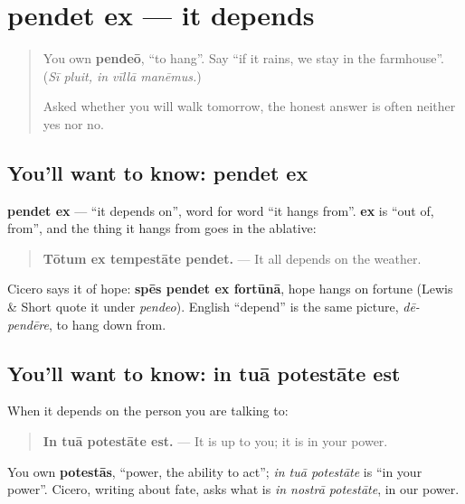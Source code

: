 \section[pendet ex]{pendet ex — it depends}

\label{lesson:LA-C289-pendet-ex}



\begin{quote}
You own \textbf{pendeō}, \textquotedblleft{}to hang\textquotedblright{}. Say \textquotedblleft{}if it rains, we stay in the farmhouse\textquotedblright{}. (\emph{Sī pluit, in vīllā manēmus.})

Asked whether you will walk tomorrow, the honest answer is often neither yes nor no.
\end{quote}

\subsection*{You'll want to know: pendet ex}
\textbf{pendet ex} — \textquotedblleft{}it depends on\textquotedblright{}, word for word \textquotedblleft{}it hangs from\textquotedblright{}. \textbf{ex} is \textquotedblleft{}out of, from\textquotedblright{}, and the thing it hangs from goes in the ablative:

\begin{quote}
\textbf{Tōtum ex tempestāte pendet.} — It all depends on the weather.
\end{quote}

Cicero says it of hope: \textbf{spēs pendet ex fortūnā}, hope hangs on fortune (Lewis \& Short quote it under \emph{pendeo}). English \textquotedblleft{}depend\textquotedblright{} is the same picture, \emph{dē-pendēre}, to hang down from.

\subsection*{You'll want to know: in tuā potestāte est}
When it depends on the person you are talking to:

\begin{quote}
\textbf{In tuā potestāte est.} — It is up to you; it is in your power.
\end{quote}

You own \textbf{potestās}, \textquotedblleft{}power, the ability to act\textquotedblright{}; \emph{in tuā potestāte} is \textquotedblleft{}in your power\textquotedblright{}. Cicero, writing about fate, asks what is \emph{in nostrā potestāte}, in our power.

